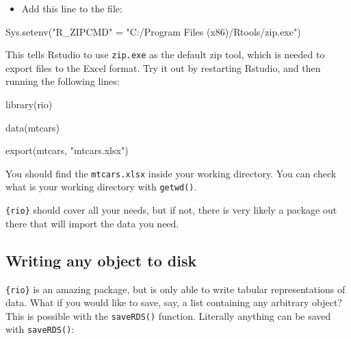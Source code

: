 \documentclass[
]{article}
\newenvironment{Shaded}{\begin{snugshade}}{\end{snugshade}}
\newcommand{\FunctionTok}[1]{\textcolor[rgb]{0.00,0.00,0.00}{#1}}
\newcommand{\NormalTok}[1]{#1}
\newcommand{\OtherTok}[1]{\textcolor[rgb]{0.56,0.35,0.01}{#1}}
\newcommand{\StringTok}[1]{\textcolor[rgb]{0.31,0.60,0.02}{#1}}
\providecommand{\tightlist}{%
  \setlength{\itemsep}{0pt}\setlength{\parskip}{0pt}}
\begin{document}
\begin{itemize}
\tightlist
\item
  Add this line to the file:
\end{itemize}

\begin{Shaded}
\begin{Highlighting}[]
\FunctionTok{Sys.setenv}\NormalTok{(}\StringTok{"R\_ZIPCMD"} \OtherTok{=} \StringTok{"C:/Program Files (x86)/Rtools/zip.exe"}\NormalTok{)}
\end{Highlighting}
\end{Shaded}

This tells Rstudio to use \texttt{zip.exe} as the default zip tool, which is needed to export files to the
Excel format. Try it out by restarting Rstudio, and then running the following lines:

\begin{Shaded}
\begin{Highlighting}[]
\FunctionTok{library}\NormalTok{(rio)}

\FunctionTok{data}\NormalTok{(mtcars)}

\FunctionTok{export}\NormalTok{(mtcars, }\StringTok{"mtcars.xlsx"}\NormalTok{)}
\end{Highlighting}
\end{Shaded}

You should find the \texttt{mtcars.xlsx} inside your working directory. You can check what is your working
directory with \texttt{getwd()}.

\texttt{\{rio\}} should cover all your needs, but if not, there is very likely a package out there that will
import the data you need.

\hypertarget{writing-any-object-to-disk}{%
\subsection{Writing any object to disk}\label{writing-any-object-to-disk}}

\texttt{\{rio\}} is an amazing package, but is only able to write tabular representations of data. What if you
would like to save, say, a list containing any arbitrary object? This is possible with the
\texttt{saveRDS()} function. Literally anything can be saved with \texttt{saveRDS()}:
\end{document}
